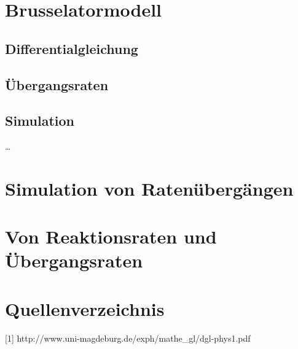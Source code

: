 \documentclass{scrartcl}
\begin{document}
\newpage

\section{Brusselatormodell}
\subsection{Differentialgleichung}
\subsection{Übergangsraten}
\subsection{Simulation}
\dots 
\section{Simulation von Ratenübergängen}
\section{Von Reaktionsraten und Übergangsraten}
\newpage
\section{Quellenverzeichnis}
[1] http://www.uni-magdeburg.de/exph/mathe\_gl/dgl-phys1.pdf
\end{document}
